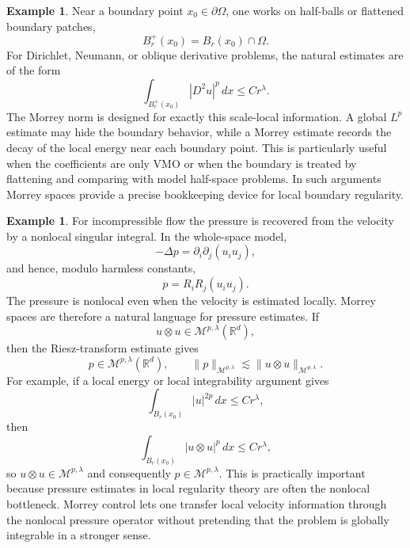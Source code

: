 \documentclass[11pt]{article}
\theoremstyle{definition}
\newtheorem{example}[theorem]{Example}
\newcommand{\R}{\mathbb R}
\begin{document}
\begin{example}\label{ex:boundary-morrey}
Near a boundary point $x_0\in\partial\Omega$, one works on half-balls or flattened boundary patches,
\[
        B_r^+(x_0)=B_r(x_0)\cap\Omega .
\]
For Dirichlet, Neumann, or oblique derivative problems, the natural estimates are of the form
\[
        \int_{B_r^+(x_0)} |D^2u|^p\,dx
        \le
        C r^\lambda .
\]
The Morrey norm is designed for exactly this scale-local information.  A global $L^p$ estimate may hide the boundary behavior, while a Morrey estimate records the decay of the local energy near each boundary point.  This is particularly useful when the coefficients are only VMO or when the boundary is treated by flattening and comparing with model half-space problems.  In such arguments Morrey spaces provide a precise bookkeeping device for local boundary regularity.
\end{example}

\begin{example}\label{ex:navier-stokes-pressure-morrey}
For incompressible flow the pressure is recovered from the velocity by a nonlocal singular integral.  In the whole-space model,
\[
        -\Delta p=\partial_i\partial_j(u_i u_j),
\]
and hence, modulo harmless constants,
\[
        p=R_iR_j(u_i u_j).
\]
The pressure is nonlocal even when the velocity is estimated locally.  Morrey spaces are therefore a natural language for pressure estimates.  If
\[
        u\otimes u\in \mathcal M^{p,\lambda}(\R^d),
\]
then the Riesz-transform estimate gives
\[
        p\in \mathcal M^{p,\lambda}(\R^d),
        \qquad
        \|p\|_{\mathcal M^{p,\lambda}}
        \lesssim
        \|u\otimes u\|_{\mathcal M^{p,\lambda}} .
\]
For example, if a local energy or local integrability argument gives
\[
        \int_{B_r(x_0)} |u|^{2p}\,dx\le C r^\lambda,
\]
then
\[
        \int_{B_r(x_0)} |u\otimes u|^p\,dx\le C r^\lambda,
\]
so $u\otimes u\in\mathcal M^{p,\lambda}$ and consequently $p\in\mathcal M^{p,\lambda}$.  This is practically important because pressure estimates in local regularity theory are often the nonlocal bottleneck.  Morrey control lets one transfer local velocity information through the nonlocal pressure operator without pretending that the problem is globally integrable in a stronger sense.
\end{example}
\end{document}
